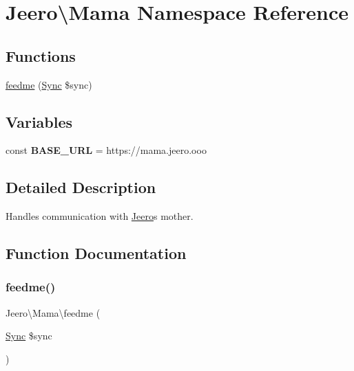 \hypertarget{namespaceJeero_1_1Mama}{}\section{Jeero\textbackslash{}Mama Namespace Reference}
\label{namespaceJeero_1_1Mama}
\subsection*{Functions}
\begin{DoxyCompactItemize}
\item 
\hyperlink{namespaceJeero_1_1Mama_abce41054d976a972a3d35ae3947d99f8}{feedme} (\hyperlink{classJeero_1_1Syncs_1_1Sync}{Sync} \$sync)
\end{DoxyCompactItemize}
\subsection*{Variables}
\begin{DoxyCompactItemize}
\item 
\mbox{\label{namespaceJeero_1_1Mama_a4c88ec003a47a1e8a06489edcf3c9db4}} 
const {\bfseries B\+A\+S\+E\+\_\+\+U\+RL} = \textquotesingle{}https\+://mama.\+jeero.\+ooo\textquotesingle{}
\end{DoxyCompactItemize}


\subsection{Detailed Description}
Handles communication with \hyperlink{namespaceJeero}{Jeero}\textquotesingle{}s mother. 

\subsection{Function Documentation}
\mbox{\label{namespaceJeero_1_1Mama_abce41054d976a972a3d35ae3947d99f8}} 
\subsubsection{\texorpdfstring{feedme()}{feedme()}}
{\footnotesize\ttfamily Jeero\textbackslash{}\+Mama\textbackslash{}feedme (\begin{DoxyParamCaption}\item[{\hyperlink{classJeero_1_1Syncs_1_1Sync}{Sync}}]{\$sync }\end{DoxyParamCaption})}

